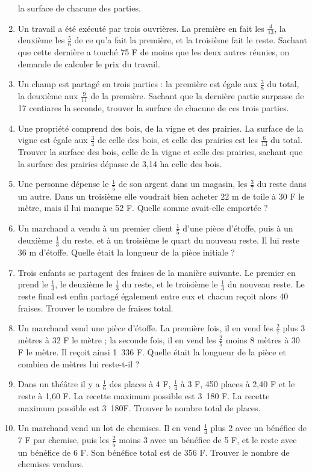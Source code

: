 \documentclass[12 pt]{extarticle}
\theoremstyle{plain}
\begin{document}
\begin{enumerate}
 la surface de chacune des parties. 
 \item Un travail a été exécuté par trois ouvrières. La première en fait les $\frac4{13}$, la deuxième les $\frac56$ de ce qu'a fait la 
 première, et la troisième fait le reste. Sachant que cette dernière a touché 75 F de moins que les deux autres réunies, on demande de calculer le prix du travail.
 \item Un champ est partagé en trois parties : la première est égale aux $\frac38$ du total, la deuxième aux $\frac9{11}$ de la première. Sachant que la dernière partie surpasse de 17 centiares la seconde, trouver la surface de chacune de ces trois parties.
 \item Une propriété comprend des bois, de la vigne et des prairies. La surface de la vigne est égale aux $\frac34$ de celle des bois, et celle des prairies est les $\frac6{13}$ du total. Trouver la surface des bois, celle de la vigne et celle des prairies, sachant que la surface des prairies dépasse de 3,14 ha celle des bois. 
 \item Une personne dépense le $\frac15$ de son argent dans un magasin, les $\frac37$ du reste dans un autre. Dans un troisième elle voudrait bien acheter $22$ m de toile à 30 F le mètre, mais il lui manque 52 F. Quelle somme avait-elle emportée ?
 \item Un marchand a vendu à un premier client $\frac15$ d'une pièce d'étoffe, puis à un deuxième $\frac13$ du reste, et à un troisième le quart du nouveau reste. Il lui reste 36 m d'étoffe. Quelle était la longueur de la pièce initiale ? 
 \item Trois enfants se partagent des fraises de la manière suivante. Le premier en prend le $\frac13$, le deuxième le $\frac13$ du reste, et le troisième le $\frac13$ du nouveau reste. Le reste final est enfin partagé également entre eux et chacun reçoit alors 40 fraises. Trouver le nombre de fraises total. 
 \item Un marchand vend une pièce d'étoffe. La première fois, il en vend les $\frac27$ plus 3 mètres à 32 F le mètre ; la seconde fois, il en vend les $\frac25$ moins 8 mètres à 30 F le mètre. Il reçoit ainsi 1~336 F. Quelle était la longueur de la pièce et combien de 
 mètres lui reste-t-il ? 
 \item Dans un théâtre il y a $\frac16$ des places à 4 F, $\frac14$ à 3 F, 450 places à 2,40 F et le reste à 1,60 F. La recette maximum
 possible est 3~180 F. La recette maximum possible est 3~180F. Trouver le nombre total de places. 
 \item Un marchand vend un lot de chemises. Il en vend $\frac14$ plus 2 avec un bénéfice de 7 F par chemise, puis les $\frac25$ moins 3 avec un bénéfice de 5 F, et le reste avec un bénéfice de 6 F. Son bénéfice total est de 356 F. Trouver le nombre de chemises vendues. 

\end{enumerate}
\end{document}
